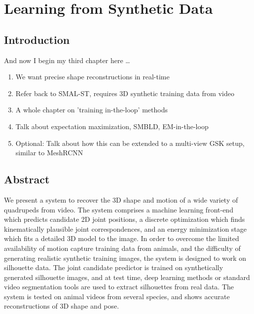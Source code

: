 

\chapter{Learning from Synthetic Data}

\def\figref#1{Fig.~\ref{fig:#1}}

\ifpdf
    \graphicspath{{Chapter3/Figs/Raster/}{Chapter3/Figs/PDF/}{Chapter3/Figs/}}
\else
    \graphicspath{{Chapter3/Figs/Vector/}{Chapter3/Figs/}}
\fi

\section{Introduction}
And now I begin my third chapter here \dots

\begin{enumerate}
  \item We want precise shape reconstructions in real-time
  \item Refer back to SMAL-ST, requires 3D synthetic training data from video
  \item A whole chapter on 'training in-the-loop' methods
  \item Talk about expectation maximization, SMBLD, EM-in-the-loop
  \item Optional: Talk about how this can be extended to a multi-view GSK setup, similar to MeshRCNN
\end{enumerate}


\section{Abstract}
We present a system to recover the 3D shape and motion of a wide variety of quadrupeds from video.  The system comprises a machine learning front-end which predicts candidate 2D joint positions, a discrete optimization which finds kinematically plausible joint correspondences, 
and an energy minimization stage which fits a detailed 3D model to the image. In order to overcome the limited availability of motion capture training data from animals, and the difficulty of generating realistic synthetic training images, the system is designed to work on silhouette data.  The joint candidate predictor is trained on synthetically generated silhouette images, and at test time, deep learning methods or standard video segmentation tools are used to extract silhouettes from real data. The system is tested on animal videos from several species, and shows accurate reconstructions of 3D shape and pose.


